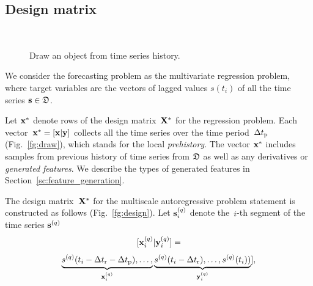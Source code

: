 \documentclass[conference]{IEEEtran}
\begin{document}
\subsection{Design matrix}

\begin{figure}[!ht]
\centering
{} \\
\centering{}
\caption{Draw an object from time series history.}
\end{figure}
 We consider the forecasting problem as the multivariate regression problem, where target variables are the vectors of lagged values $s(t_i)$ of all the time series ${\mathbf{s}} \in {\mathfrak{D}}$.
 
Let ${\mathbf{x}}^{*}$ denote rows of the design matrix~${\mathbf{X}}^*$ for the regression problem. Each vector~${\mathbf{x}}^{*} = [{\mathbf{x}}| {\mathbf{y}}]$ collects all the time series over the time period~$\Delta t_\text{p}$ (Fig.~\ref{fg:draw}), which stands for the local \emph{prehistory}. The vector ${\mathbf{x}}^{*}$ includes samples from previous history of time series from ${\mathfrak{D}}$ as well as any derivatives or \emph{generated features}. We describe the types of generated features in Section~\ref{sc:feature_generation}.

The design matrix~${\mathbf{X}}^*$ for the multiscale autoregressive problem statement is constructed  as follows (Fig.~\ref{fg:design}). Let ${\mathbf{s}}^{(q)}_i$ denote the~$i$-th segment of the time series ${\mathbf{s}}^{(q)}$
\begin{equation}\label{eq:segment}
[\bx^{(q)}_i | \by^{(q)}_i] = \end{equation}
\[ \underbrace{s^{(q)}(t_i-\Delta t_\text{r}-\Delta t_\text{p}),\dots,}_{{\mathbf{x}}^{(q)}_i} \underbrace{s^{(q)}(t_i-\Delta t_\text{r}),\dots,s^{(q)}(t_i))}_{{\mathbf{y}}^{(q)}_i}], \]
\end{document}
